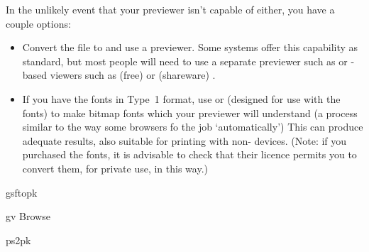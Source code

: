 In the unlikely event that your previewer isn't capable of either, you
have a couple options:
\begin{itemize}
\item Convert the  file to \PS{} and use a
  \PS{} previewer.  Some systems offer this capability as
  standard, but most people will need to use a separate previewer such
  as \href{http://www.ghostscript.com/}{} or
  -based viewers
  such as (free)  or (shareware)
  \href{http://www.ghostgum.com.au/}{}.
\item If you have the \PS{} fonts in Type~1 format, use
   or  (designed for use with the
  \href{http://www.ghostscript.com/}{} fonts) to
  make  bitmap fonts which
  your previewer will understand (a process similar to the way some
  browsers fo the job `automatically') This can produce adequate results,
  also suitable for printing with non-\PS{} devices.  (Note: if you
  purchased the fonts, it is advisable to check that their licence
  permits you to convert them, for private use, in this way.)
\end{itemize}
\begin{ctanrefs}
\item[gsftopk]
\item[gv]Browse 
\item[ps2pk]
\end{ctanrefs}


